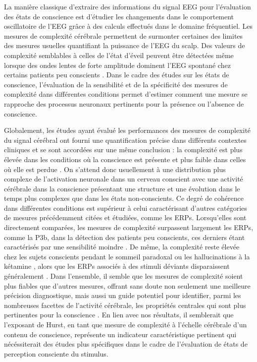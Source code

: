 La manière classique d'extraire des informations du signal EEG pour l'évaluation des états de conscience est d'étudier les changements dans le comportement oscillatoire de l'EEG grâce à des calculs effectués dans le domaine fréquentiel.  
Les mesures de complexité cérébrale permettent de surmonter certaines des limites des mesures usuelles quantifiant la puissance de l'EEG du scalp. 
Des valeurs de complexité semblables à celles de l'état d'éveil peuvent être détectées même lorsque des ondes lentes de forte amplitude dominent l'EEG spontané chez certains patients peu conscients \citep{casarotto2016stratification}. 
Dans le cadre des études sur les états de conscience, l'évaluation de la sensibilité et de la spécificité des mesures de complexité dans différentes conditions permet d'estimer comment une mesure se rapproche des processus neuronaux pertinents pour la présence ou l'absence de conscience. 

Globalement, les études ayant évalué les performances des mesures de complexité du signal cérébral ont fourni une quantification précise dans différents contextes cliniques et se sont accordées sur une même conclusion : la complexité est plus élevée dans les conditions où la conscience est présente et plus faible dans celles où elle est perdue \citep{sarasso2021consciousness}. 
On s'attend donc usuellement à une distribution plus complexe de l'activation neuronale dans un cerveau conscient avec une activité cérébrale dans la conscience présentant une structure et une évolution dans le temps plus complexes que dans les états non-conscients. 
Ce degré de cohérence dans différentes conditions est supérieur à celui caractérisant d'autres catégories de mesures précédemment citées et étudiées, comme les ERPs. 
Lorsqu'elles sont directement comparées, les mesures de complexité surpassent largement les ERPs, comme la P3b, dans la détection des patients peu conscients, ces derniers étant caractérisés par une sensibilité moindre \citep{sarasso2021consciousness, sitt2014large}. 
De même, la complexité reste élevée chez les sujets conscients pendant le sommeil paradoxal ou les hallucinations à la kétamine \citep{casarotto2016stratification, farnes2020increased}, alors que les ERPs associés à des stimuli déviants disparaissent généralement \citep{bravermanova2018psilocybin, strauss2015disruption}. 
Dans l'ensemble, il semble que les mesures de complexité soient plus fiables que d'autres mesures, offrant sans doute non seulement une meilleure précision diagnostique, mais aussi un guide potentiel pour identifier, parmi les nombreuses facettes de l'activité cérébrale, les propriétés centrales qui sont plus pertinentes pour la conscience \citep{kreuzer2017eeg}.
En lien avec nos résultats, il semblerait que l'exposant de Hurst, en tant que mesure de complexité à l'échelle cérébrale d'un contenu de conscience, représente un indicateur caractéristique pertinent qui nécéssiterait des études plus spécifiques dans le cadre de l'évaluation de états de perception consciente du stimulus. 

